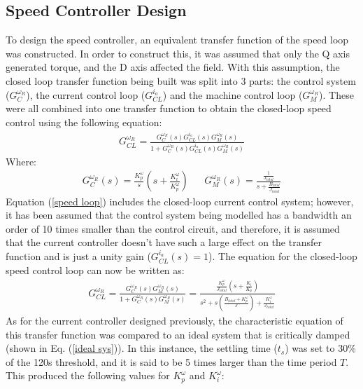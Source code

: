     \subsection{Speed Controller Design}
        To design the speed controller, an equivalent transfer function of the speed loop was constructed. In order to construct this, it was assumed that only the Q axis generated torque, and the D axis affected the field. With this assumption, the closed loop transfer function being built was split into 3 parts: the control system (\(G_C^{\omega_R}\)), the current control loop (\(G_{CL}^{i_a}\)) and the machine control loop (\(G_M^{\omega_R}\)). These were all combined into one transfer function to obtain the closed-loop speed control using the following equation:
        \begin{align}
            G_{CL}^{\omega_R} = \frac{G_C^{\omega_R}(s) G_{CL}^{i_a}(s) G_M^{\omega_R}(s)}{1 + G_C^{\omega_R}(s) G_{CL}^{i_a}(s) G_M^{\omega_R}(s)} \label{speed loop}
        \end{align}
        Where:
        \begin{align}
            G_C^{\omega_R}(s) = \frac{K_p^\omega}{s}\left(s+\frac{K_i^\omega}{K_p^\omega}\right) && G_M^{\omega_R}(s) = \frac{\frac{1}{J_{total}}}{s+\frac{B_{total}}{J_{total}}}
        \end{align}
        Equation (\ref{speed loop}) includes the closed-loop current control system; however, it has been assumed that the control system being modelled has a bandwidth an order of 10 times smaller than the control circuit, and therefore, it is assumed that the current controller doesn't have such a large effect on the transfer function and is just a unity gain (\(G_{CL}^{i_a}(s) = 1\)). The equation for the closed-loop speed control loop can now be written as:
        \begin{align}
            G_{CL}^{\omega_R} = \frac{G_C^{\omega_R}(s) G_M^{\omega_R}(s)}{1 + G_C^{\omega_R}(s) G_M^{\omega_R}(s)} = \frac{\frac{K_p^\omega}{J_{total}}\left(s + \frac{K_i}{K_p}\right)}{s^2 + s\left(\frac{B_{total}+K_p^\omega}{J}\right) + \frac{K_i^\omega}{J_{total}}}
        \end{align}
        As for the current controller designed previously, the characteristic equation of this transfer function was compared to an ideal system that is critically damped (shown in Eq. (\ref{ideal sys})). In this instance, the settling time (\(t_s\)) was set to 30\% of the 120s threshold, and it is said to be 5 times larger than the time period \(T\). This produced the following values for \(K_p^\omega\) and \(K_i^\omega\):
